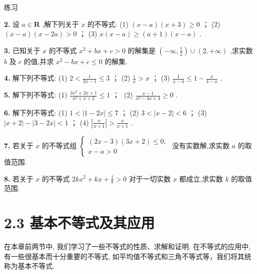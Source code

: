 \documentclass[a4paper,10pt,oneside,fontset=none]{ctexbook}
\renewcommand{\geq}{\geqslant}
\renewcommand{\leq}{\leqslant}
\newcommand{\fillin}[1][2cm]{\,\underline{\hspace{#1}}\,}
\newenvironment{exercise}[1][]{\begin{exBox}{练习}{#1}}{\end{exBox}}
\numberwithin{equation}{chapter}
\begin{document}
\begin{exercise}
\par\vspace{0.8em}
\textbf{2.} 设 $a \in  \mathbf{R}$ ,解下列关于 $x$ 的不等式: (1) $\left( {x - a}\right) \left( {x + 3}\right)  \geq  0$ ； (2) $\left( {x - a}\right) \left( {x - {2a}}\right)  > 0$ ； (3) $x\left( {x - a}\right)  \geq  \left( {a + 1}\right) \left( {x - a}\right)$ .
\par\vspace{0.8em}
\textbf{3.} 已知关于 $x$ 的不等式 ${x}^{2} + {bx} + c > 0$ 的解集是 $\left( {-\infty ,\frac{1}{2}}\right)  \cup  \left( {2, + \infty }\right)$ ,求实数 $b$ 及 $c$ 的值,并求 ${x}^{2} - {bx} + c \leq  0$ 的解集.
\par\vspace{0.8em}
\textbf{4.} 解下列不等式: (1) $2 < \frac{1}{{3x} - 1} \leq  3$ ； (2) $\frac{1}{x} > x$ ； (3) $\frac{1}{x - 4} \leq  1 - \frac{x}{4 - x}$ .
\par\vspace{0.8em}
\textbf{5.} 解下列不等式: (1) $\frac{3{x}^{2} + {2x} + 1}{{x}^{2} + x + 2} \leq  1$ ；\fillin[2cm] (2) $\frac{x - 1}{{x}^{2} - {4x} + 4} \geq  0$ .
\par\vspace{0.8em}
\textbf{6.} 解下列不等式: (1) $1 < \left| {1 - {2x}}\right|  \leq  7$ ； (2) $3 < \left| {x - 2}\right|  < 6$ ； (3) $\left| {x + 2}\right|  - \left| {3 - {2x}}\right|  < 1$ ； (4) $\left| \frac{x}{x + 1}\right|  > \frac{x}{x + 1}$ .
\par\vspace{0.8em}
\textbf{7.} 若关于 $x$ 的不等式组 $\left\{  \begin{array}{l} \left( {{2x} - 3}\right) \left( {{3x} + 2}\right)  \leq  0, \\  x - a > 0 \end{array}\right.$ 没有实数解,求实数 $a$ 的取值范围.
\par\vspace{0.8em}
\textbf{8.} 若关于 $x$ 的不等式 ${2k}{x}^{2} + {kx} + \frac{1}{8} > 0$ 对于一切实数 $x$ 都成立,求实数 $k$ 的取值范围.
\end{exercise}

\section{2.3 基本不等式及其应用}

在本章前两节中, 我们学习了一些不等式的性质、求解和证明. 在不等式的应用中, 有一些很基本而十分重要的不等式, 如平均值不等式和三角不等式等，我们将其统称为基本不等式.
\end{document}
